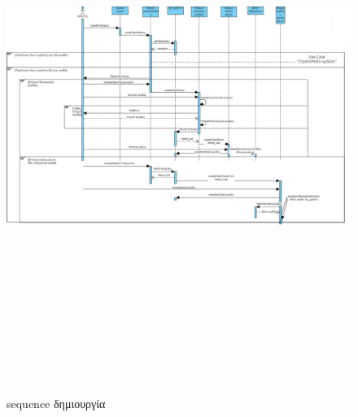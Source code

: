 \begin{figure}[!htb]
  \centering
    \centering
    \includegraphics[width=\textwidth,height=18cm]{sequence_dhmiourgia.png}
    \caption{sequence δημιουργία}
    \label{}
\end{figure}
